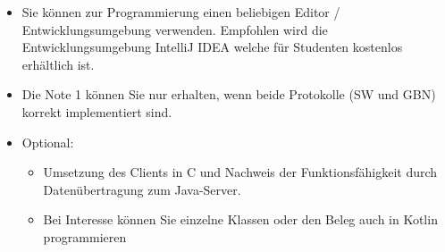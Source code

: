 \documentclass{article}
\begin{document}
\begin{itemize}
        \item Sie können zur Programmierung einen beliebigen Editor / Entwicklungsumgebung verwenden. Empfohlen wird die Entwicklungsumgebung IntelliJ IDEA welche für Studenten kostenlos erhältlich ist.
        \item Die Note 1 können Sie nur erhalten, wenn beide Protokolle (SW und GBN) korrekt implementiert sind.
        \item Optional:
        \begin{itemize}
            \item Umsetzung des Clients in C und Nachweis der Funktionsfähigkeit durch Datenübertragung zum Java-Server.
            \item Bei Interesse können Sie einzelne Klassen oder den Beleg auch in Kotlin programmieren
        \end{itemize}
    \end{itemize}
\end{document}
